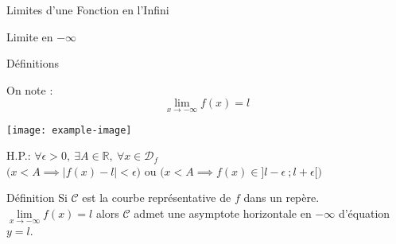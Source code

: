 \documentclass{cours}
\begin{document}
\begin{Gpartie}{Limites d'une Fonction en l'Infini}
\begin{Spartie}{Limite en $-\infty$}
\begin{SSpartie}{Définitions}
\begin{itemize}
                    On note : \[\lim\limits_{x\to-\infty}f(x)=l\]
                    \begin{center}
                            \texttt{[image: example-image]}
                        \parbox{\linewidth}{}
                    \end{center}
                    \vspace*{2ex}
                    H.P.: $\forall\epsilon >0,~\exists A\in\mathbb{R},~\forall x\in\mathcal{D}_f$ \\ \phantom{H.P.: }$\bigg(x<A\implies\left\lvert f(x)-l\right\rvert <\epsilon\bigg)$ ou $\bigg(x<A\implies f(x)\in\big]l-\epsilon~;l+\epsilon\big[\bigg)$
                \end{itemize}
            \end{SSpartie}
            \begin{SSpartie}{Définition} 
                Si $\mathcal{C}$ est la courbe représentative de $f$ dans un repère. $\lim\limits_{x\to-\infty}f(x)=l$ alors $\mathcal{C}$ admet une asymptote horizontale en $-\infty$ d'équation $y=l$.
            \end{SSpartie}
        \end{Spartie}
    \end{Gpartie}
    \pagebreak
\end{document}

